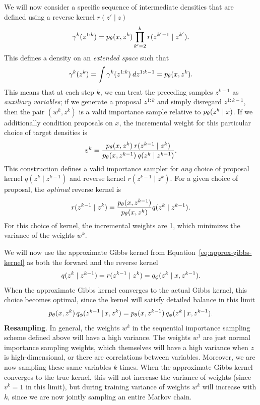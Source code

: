 \documentclass{article}
\theoremstyle{definition}
\begin{document}
We will now consider a specific sequence of intermediate densities that are defined using a reverse kernel $r(z' \mid z)$
\begin{align*}
    \gamma^k(z^{1:k})
    =
    p_\theta(x,z^k) \prod_{k'=2}^{k} r(z^{k'-1} \mid z^{k'})
    .
\end{align*}
This defines a density on an \emph{extended space} such that 
\begin{align*}
    \gamma^k(z^k) = \int \gamma^k(z^{1:k}) \: dz^{1:k-1} = p_\theta(x, z^k).
\end{align*}
This means that at each step $k$, we can treat the preceding samples $z^{k-1}$ as \emph{auxiliary variables}; if we generate a proposal $z^{1:k}$ and simply disregard $z^{1:k-1}$, then the pair $(w^k, z^k)$ is a valid importance sample relative to $p_\theta(z^k \mid x)$. If we additionally condition proposals on $x$, the incremental weight for this particular choice of target densities is
\begin{align}
    \label{eq:incremental-weight-forward-reverse}
    v^k 
    = 
    \frac{p_\theta(x,z^k) \: r(z^{k-1} \mid  z^k)}
         {p_\theta(x,z^{k-1}) \: q(z^{k} \mid  z^{k-1})}
    .
\end{align}
This construction defines a valid importance sampler for \emph{any} choice of proposal kernel $q(z^k \mid z^{k-1})$ and reverse kernel $r(z^{k-1} \mid z^{k})$. For a given choice of proposal, the \emph{optimal} reverse kernel is
\begin{align*}
    r(z^{k-1} \mid  z^k)
    =   
    \frac{p_\theta(x,z^{k-1})}
         {p_\theta(x,z^k)}
    q(z^{k} \mid  z^{k-1})
    .
\end{align*}
For this choice of kernel, the incremental weights are 1, which minimizes the variance of the weights $w^k$.

We will now use the approximate Gibbs kernel from Equation~\ref{eq:approx-gibbs-kernel} as both the forward and the reverse kernel
\begin{align}
    q(z^{k} \mid  z^{k-1}) = r(z^{k-1} \mid  z^k) = q_\phi(z^k \mid x, z^{k-1}).
\end{align}
When the approximate Gibbs kernel converges to the actual Gibbs kernel, this choice becomes optimal, since the kernel will satisfy detailed balance in this limit
\begin{align*}
    p_\theta(x, z^k) 
    \,
    q_\phi(z^{k-1} \,|\, x, z^{k})
    =
    p_\theta(x, z^{k-1}) 
    \,
    q_\phi(z^{k} \,|\, x, z^{k-1}).
\end{align*}
\textbf{Resampling}. In general, the weights $w^k$ in the sequential importance sampling scheme defined above will have a high variance. The weights $w^1$ are just normal importance sampling weights, which themselves will have a high variance when $z$ is high-dimensional, or there are correlations between variables. Moreover, we are now sampling these same variables $k$ times. When the approximate Gibbs kernel converges to the true kernel, this will not increase the variance of weights (since $v^k=1$ in this limit), but during training variance of weights $w^k$ will increase with $k$, since we are now jointly sampling an entire Markov chain.
\end{document}
